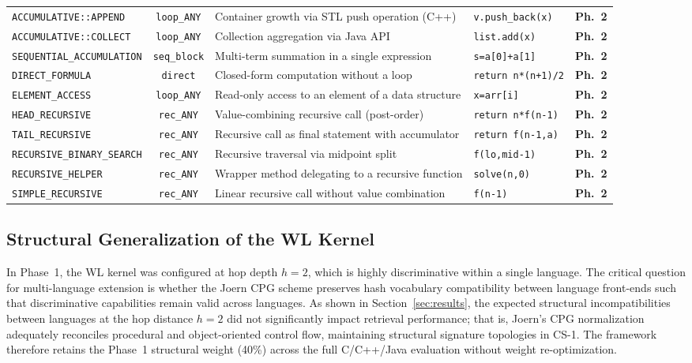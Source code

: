 \begin{table}[tp]
\begin{tabular}{|l|c|p{5.8cm}|l|c|}
\texttt{ACCUMULATIVE::APPEND}      & \texttt{loop\_ANY} & Container growth via STL push operation (C++) & \texttt{v.push\_back(x)} & \textbf{Ph.~2} \\
\texttt{ACCUMULATIVE::COLLECT}     & \texttt{loop\_ANY} & Collection aggregation via Java API & \texttt{list.add(x)} & \textbf{Ph.~2} \\
\texttt{SEQUENTIAL\_ACCUMULATION}  & \texttt{seq\_block} & Multi-term summation in a single expression & \texttt{s=a[0]+a[1]} & \textbf{Ph.~2} \\
\texttt{DIRECT\_FORMULA}           & \texttt{direct}    & Closed-form computation without a loop & \texttt{return n*(n+1)/2} & \textbf{Ph.~2} \\
\texttt{ELEMENT\_ACCESS}           & \texttt{loop\_ANY} & Read-only access to an element of a data structure & \texttt{x=arr[i]} & \textbf{Ph.~2} \\
\texttt{HEAD\_RECURSIVE}           & \texttt{rec\_ANY} & Value-combining recursive call (post-order) & \texttt{return n*f(n-1)} & \textbf{Ph.~2} \\
\texttt{TAIL\_RECURSIVE}           & \texttt{rec\_ANY} & Recursive call as final statement with accumulator & \texttt{return f(n-1,a)} & \textbf{Ph.~2} \\
\texttt{RECURSIVE\_BINARY\_SEARCH} & \texttt{rec\_ANY} & Recursive traversal via midpoint split & \texttt{f(lo,mid-1)} & \textbf{Ph.~2} \\
\texttt{RECURSIVE\_HELPER}         & \texttt{rec\_ANY} & Wrapper method delegating to a recursive function & \texttt{solve(n,0)} & \textbf{Ph.~2} \\
\texttt{SIMPLE\_RECURSIVE}         & \texttt{rec\_ANY} & Linear recursive call without value combination & \texttt{f(n-1)} & \textbf{Ph.~2} \\
\hline
\end{tabular}
\end{table}

\subsection{Structural Generalization of the WL Kernel}
\label{subsec:wl_adaptation}
In Phase~1, the WL kernel was configured at hop depth $h=2$, which is highly discriminative within a single language. The critical question for multi-language extension is whether the Joern CPG scheme preserves hash vocabulary compatibility between language front-ends such that discriminative capabilities remain valid across languages. As shown in Section~\ref{sec:results}, the expected structural incompatibilities between languages at the hop distance $h=2$ did not significantly impact retrieval performance; that is, Joern's CPG normalization adequately reconciles procedural and object-oriented control flow, maintaining structural signature topologies in CS-1. The framework therefore retains the Phase~1 structural weight (40\%) across the full C/C++/Java evaluation without weight re-optimization.

